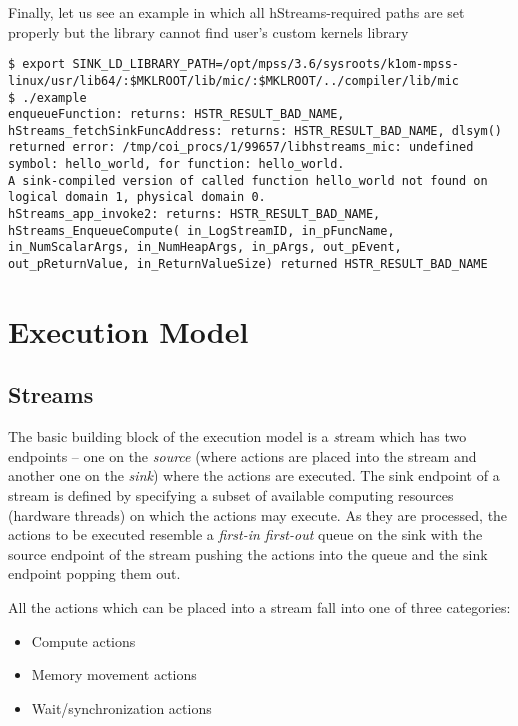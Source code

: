 \documentclass[a4,oneside]{book}
\newcommand{\hstreams}{hStreams}
\begin{document}
Finally, let us see an example in which all \hstreams-required paths are set properly but the library cannot find user's custom kernels library
\begin{lstlisting}[style=BashCmdListingStyle,caption={Running the example with user's custom kernels library location missing from \texttt{SINK\_LD\_LIBRARY\_PATH}},frame=tlrb,label={lst:example-incompletesinkld1}]
$ export SINK_LD_LIBRARY_PATH=/opt/mpss/3.6/sysroots/k1om-mpss-linux/usr/lib64/:$MKLROOT/lib/mic/:$MKLROOT/../compiler/lib/mic
$ ./example
enqueueFunction: returns: HSTR_RESULT_BAD_NAME, hStreams_fetchSinkFuncAddress: returns: HSTR_RESULT_BAD_NAME, dlsym() returned error: /tmp/coi_procs/1/99657/libhstreams_mic: undefined symbol: hello_world, for function: hello_world.
A sink-compiled version of called function hello_world not found on logical domain 1, physical domain 0.
hStreams_app_invoke2: returns: HSTR_RESULT_BAD_NAME, hStreams_EnqueueCompute( in_LogStreamID, in_pFuncName, in_NumScalarArgs, in_NumHeapArgs, in_pArgs, out_pEvent, out_pReturnValue, in_ReturnValueSize) returned HSTR_RESULT_BAD_NAME
\end{lstlisting}

\section{Execution Model}
\subsection{Streams}
The basic building block of the execution model is a \emph stream which has two endpoints -- one on the \emph{source} (where actions are placed into the stream and another one on the \emph{sink}) where the actions are executed.
The sink endpoint of a stream is defined by specifying a subset of available computing resources (hardware threads) on which the actions may execute.
As they are processed, the actions to be executed resemble a \emph{first-in first-out} queue on the sink with the source endpoint of the stream pushing the actions into the queue and the sink endpoint popping them out.

All the actions which can be placed into a stream fall into one of three categories:
\begin{itemize}
    \item Compute actions
    \item Memory movement actions
    \item Wait/synchronization actions
\end{itemize}
\end{document}
